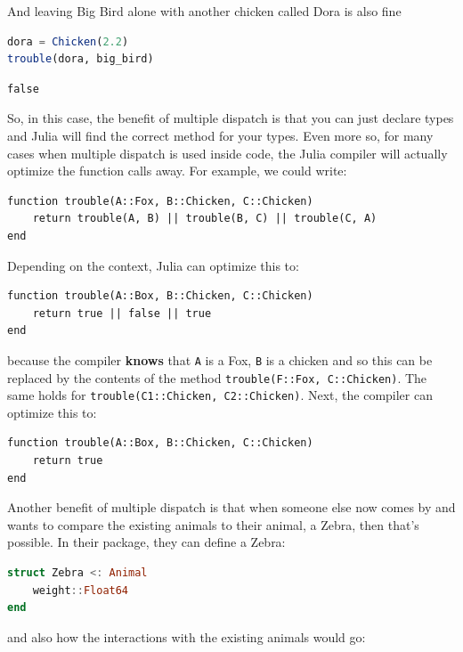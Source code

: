 \documentclass[
  notoc %
]{tufte-book}
\newcommand{\passthrough}[1]{#1}
\begin{document}
And leaving Big Bird alone with another chicken called Dora is also fine

\begin{lstlisting}[language=Julia]
dora = Chicken(2.2)
trouble(dora, big_bird)
\end{lstlisting}

\begin{lstlisting}[language=Output]
false
\end{lstlisting}

So, in this case, the benefit of multiple dispatch is that you can just
declare types and Julia will find the correct method for your types.
Even more so, for many cases when multiple dispatch is used inside code,
the Julia compiler will actually optimize the function calls away. For
example, we could write:

\begin{lstlisting}
function trouble(A::Fox, B::Chicken, C::Chicken)
    return trouble(A, B) || trouble(B, C) || trouble(C, A)
end
\end{lstlisting}

Depending on the context, Julia can optimize this to:

\begin{lstlisting}
function trouble(A::Box, B::Chicken, C::Chicken)
    return true || false || true
end
\end{lstlisting}

because the compiler \textbf{knows} that \passthrough{\lstinline!A!} is
a Fox, \passthrough{\lstinline!B!} is a chicken and so this can be
replaced by the contents of the method
\passthrough{\lstinline!trouble(F::Fox, C::Chicken)!}. The same holds
for \passthrough{\lstinline!trouble(C1::Chicken, C2::Chicken)!}. Next,
the compiler can optimize this to:

\begin{lstlisting}
function trouble(A::Box, B::Chicken, C::Chicken)
    return true
end
\end{lstlisting}

Another benefit of multiple dispatch is that when someone else now comes
by and wants to compare the existing animals to their animal, a Zebra,
then that's possible. In their package, they can define a Zebra:

\begin{lstlisting}[language=Julia]
struct Zebra <: Animal
    weight::Float64
end
\end{lstlisting}

and also how the interactions with the existing animals would go:
\end{document}
